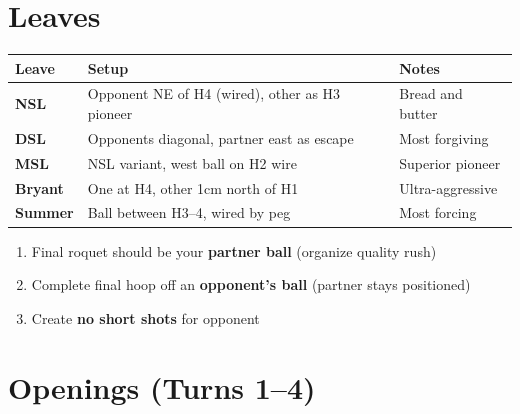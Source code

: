 \documentclass[11pt,a4paper]{article}
\begin{document}
\newpage

\section{Leaves}

\begin{tabular}{@{}p{2.8cm}p{6.5cm}p{5cm}@{}}
\toprule
\textbf{Leave} & \textbf{Setup} & \textbf{Notes} \\
\midrule
\textbf{NSL} & Opponent NE of H4 (wired), other as H3 pioneer & Bread and butter \\
\textbf{DSL} & Opponents diagonal, partner east as escape & Most forgiving \\
\textbf{MSL} & NSL variant, west ball on H2 wire & Superior pioneer \\
\textbf{Bryant} & One at H4, other 1cm north of H1 & Ultra-aggressive \\
\textbf{Summer} & Ball between H3--4, wired by peg & Most forcing \\
\bottomrule
\end{tabular}

\vspace{0.5em}

\begin{tcolorbox}[drillbox, colframe=leavecolor!70, title={\color{leavecolor}Leave Golden Rules}]
\begin{enumerate}
    \item Final roquet should be your \textbf{partner ball} (organize quality rush)
    \item Complete final hoop off an \textbf{opponent's ball} (partner stays positioned)
    \item Create \textbf{no short shots} for opponent
\end{enumerate}
\end{tcolorbox}

\section{Openings (Turns 1--4)}
\end{document}
